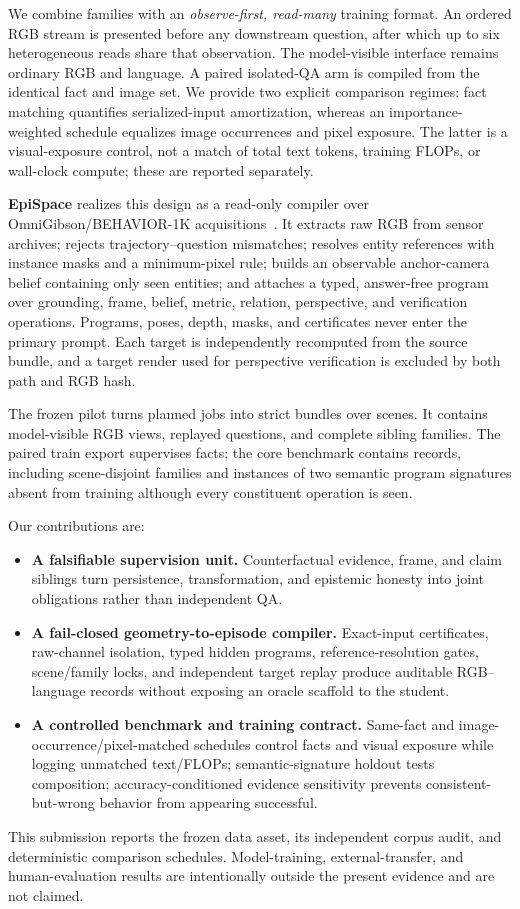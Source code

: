We combine families with an \emph{observe-first, read-many} training format.
An ordered RGB stream is presented before any downstream question, after
which up to six heterogeneous reads share that observation.  The model-visible
interface remains ordinary RGB and language.  A paired isolated-QA arm is
compiled from the identical fact and image set.  We provide two explicit
comparison regimes: fact matching quantifies serialized-input amortization,
whereas an importance-weighted schedule equalizes image occurrences and pixel
exposure.  The latter is a visual-exposure control, not a match of total text
tokens, training FLOPs, or wall-clock compute; these are reported separately.

\textbf{EpiSpace} realizes this design as a read-only compiler over
OmniGibson/BEHAVIOR-1K acquisitions~\citep{li2024behavior}.  It extracts raw
RGB from sensor archives; rejects trajectory--question mismatches; resolves
entity references with instance masks and a minimum-pixel rule; builds an
observable anchor-camera belief containing only seen entities; and attaches a
typed, answer-free program over grounding, frame, belief, metric, relation,
perspective, and verification operations.  Programs, poses, depth, masks, and
certificates never enter the primary prompt.  Each target is independently
recomputed from the source bundle, and a target render used for perspective
verification is excluded by both path and RGB hash.

The frozen pilot turns \EpiPlannedJobs{} planned jobs into
\EpiStrictBundles{} strict bundles over \EpiScenes{} scenes.  It contains
\EpiSourceViews{} model-visible RGB views, \EpiCompiledQuestions{} replayed
questions, and \EpiConsistencyFamilies{} complete sibling families.  The
paired train export supervises \EpiSupervisedFacts{} facts; the core benchmark
contains \EpiCoreBenchmarkRecords{} records, including
\EpiFamilyBenchmarkGroups{} scene-disjoint families and
\EpiCompositionRecords{} instances of two semantic program signatures absent
from training although every constituent operation is seen.

Our contributions are:
\begin{itemize}
  \item \textbf{A falsifiable supervision unit.}  Counterfactual evidence,
        frame, and claim siblings turn persistence, transformation, and
        epistemic honesty into joint obligations rather than independent QA.
  \item \textbf{A fail-closed geometry-to-episode compiler.}  Exact-input
        certificates, raw-channel isolation, typed hidden programs,
        reference-resolution gates, scene/family locks, and independent target
        replay produce auditable RGB--language records without exposing an
        oracle scaffold to the student.
  \item \textbf{A controlled benchmark and training contract.}  Same-fact and
        image-occurrence/pixel-matched schedules control facts and visual
        exposure while logging unmatched text/FLOPs; semantic-signature holdout tests
        composition; accuracy-conditioned evidence sensitivity prevents
        consistent-but-wrong behavior from appearing successful.
\end{itemize}

This submission reports the frozen data asset, its independent corpus audit,
and deterministic comparison schedules.  Model-training, external-transfer,
and human-evaluation results are intentionally outside the present evidence
and are not claimed.

